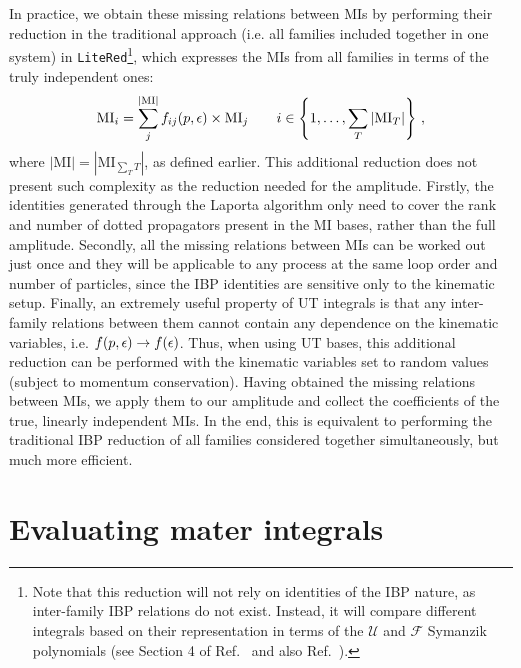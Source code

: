 \documentclass[main.tex]{subfiles}
\begin{document}
In practice, we obtain these missing relations between MIs by performing their reduction in the traditional approach (i.e. all families included together in one system) in \texttt{LiteRed}\footnote{Note that this reduction will not rely on identities of the IBP nature, as inter-family IBP relations do not exist. Instead, it will compare different integrals based on their representation in terms of the $\mathcal{U}$ and $\mathcal{F}$ Symanzik polynomials (see Section 4 of Ref.~\cite{Lee:2012cn} and also Ref.~\cite{Pak:2011xt}).}, which expresses the MIs from all families in terms of the truly independent ones:
\begin{equation}
    \text{MI}_{i} = \sum_j^{|\text{MI}|} f_{ij}(p, \epsilon) \times \text{MI}_j \qquad i \in \left\{1, \ldots, \sum_T |\text{MI}_T|\right\}\,,
\end{equation}
where $|\text{MI}| = |\text{MI}_{\sum_T T}|$, as defined earlier. This additional reduction does not present such complexity as the reduction needed for the amplitude. Firstly, the identities generated through the Laporta algorithm only need to cover the rank and number of dotted propagators present in the MI bases, rather than the full amplitude. Secondly, all the missing relations between MIs can be worked out just once and they will be applicable to any process at the same loop order and number of particles, since the IBP identities are sensitive only to the kinematic setup. Finally, an extremely useful property of UT integrals is that any inter-family relations between them cannot contain any dependence on the kinematic variables, i.e. $f(p, \epsilon) \rightarrow f(\epsilon)$. Thus, when using UT bases, this additional reduction can be performed with the kinematic variables set to random values (subject to momentum conservation). Having obtained the missing relations between MIs, we apply them to our amplitude and collect the coefficients of the true, linearly independent MIs. In the end, this is equivalent to performing the traditional IBP reduction of all families considered together simultaneously, but much more efficient.
\section{Evaluating mater integrals}
\end{document}
